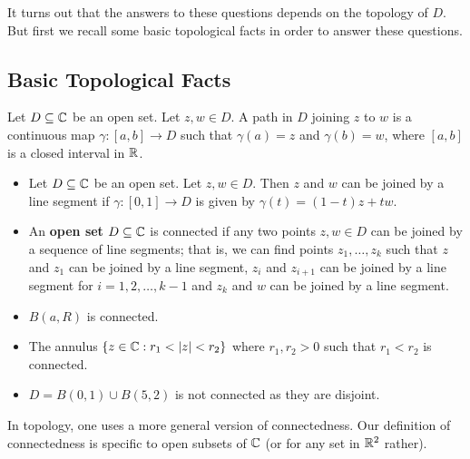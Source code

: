 \documentclass[a4paper]{article}
\begin{document}
It turns out that the answers to these questions depends on the topology of \( D  \). But first we recall some basic topological facts in order to answer these questions.

\subsection{Basic Topological Facts}

\begin{definition}[ ]
    Let \( D \subseteq  \mathbb{C}   \) be an open set. Let \( z ,w \in D  \). A path in \( D  \) joining \( z  \) to \( w  \) is a continuous map \(  \gamma : [a,b] \to D  \) such that \( \gamma(a) = z  \) and \( \gamma(b) = w  \), where \( [a,b] \) is a closed interval in \( \mathbb{R}  \).
\end{definition}

\begin{itemize}
    \item Let \( D \subseteq  \mathbb{C}   \) be an open set. Let \( z,w \in D  \). Then \( z  \) and \( w  \) can be joined by a line segment if \( \gamma:[0,1] \to D  \) is given by \( \gamma(t) = (1-t)z + tw \).
    \item An \textbf{open set} \( D \subseteq  \mathbb{C}   \) is connected if any two points \( z,w \in D  \) can be joined by a sequence of line segments; that is, we can find points \( {z}_{1}, \dots, {z}_{k} \) such that \( z  \) and \( {z}_{1} \) can be joined by a line segment, \( {z}_{i} \) and \( {z}_{i+1} \) can be joined by a line segment for \( i = 1,2, \dots , k - 1  \) and \( {z}_{k} \) and \( w  \) can be joined by a line segment.
\end{itemize}

\begin{eg}
    \begin{itemize}
        \item \(  B (a,R) \) is connected.
        \item The annulus \( \{ z \in \mathbb{C} : {r}_{1} < | z | < {r}_{2} \}  \) where \( {r}_{1}, {r}_{2} > 0  \) such that \( {r}_{1} < {r}_{2} \) is connected. 
        \item \( D = B(0,1) \cup B(5,2) \) is not connected as they are disjoint.
    \end{itemize}
\end{eg}

\begin{remark}
    In topology, one uses a more general version of connectedness. Our definition of connectedness is specific to open subsets of \( \mathbb{C}  \) (or for any set in \( \mathbb{R}^{2}  \) rather).
\end{remark}
\end{document}
